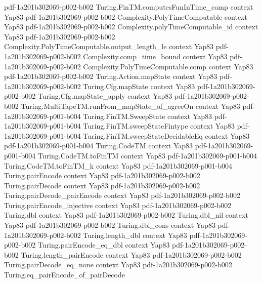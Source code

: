 \begin{theorem}
  {pdf-1a201b302069-p002-b002}
\proofstep
  {Turing.FinTM.computesFunInTime_comp}
  {context}
  {Yap83}
  {pdf-1a201b302069-p002-b002}
\proofstep
  {Complexity.PolyTimeComputable}
  {context}
  {Yap83}
  {pdf-1a201b302069-p002-b002}
\proofstep
  {Complexity.polyTimeComputable_id}
  {context}
  {Yap83}
  {pdf-1a201b302069-p002-b002}
\proofstep
  {Complexity.PolyTimeComputable.output_length_le}
  {context}
  {Yap83}
  {pdf-1a201b302069-p002-b002}
\proofstep
  {Complexity.comp_time_bound}
  {context}
  {Yap83}
  {pdf-1a201b302069-p002-b002}
\proofstep
  {Complexity.PolyTimeComputable.comp}
  {context}
  {Yap83}
  {pdf-1a201b302069-p002-b002}
\proofstep
  {Turing.Action.mapState}
  {context}
  {Yap83}
  {pdf-1a201b302069-p002-b002}
\proofstep
  {Turing.Cfg.mapState}
  {context}
  {Yap83}
  {pdf-1a201b302069-p002-b002}
\proofstep
  {Turing.Cfg.mapState_apply}
  {context}
  {Yap83}
  {pdf-1a201b302069-p002-b002}
\proofstep
  {Turing.MultiTapeTM.runFrom_mapState_of_agreeOn}
  {context}
  {Yap83}
  {pdf-1a201b302069-p001-b004}
\proofstep
  {Turing.FinTM.SweepState}
  {context}
  {Yap83}
  {pdf-1a201b302069-p001-b004}
\proofstep
  {Turing.FinTM.sweepStateFintype}
  {context}
  {Yap83}
  {pdf-1a201b302069-p001-b004}
\proofstep
  {Turing.FinTM.sweepStateDecidableEq}
  {context}
  {Yap83}
  {pdf-1a201b302069-p001-b004}
\proofstep
  {Turing.CodeTM}
  {context}
  {Yap83}
  {pdf-1a201b302069-p001-b004}
\proofstep
  {Turing.CodeTM.toFinTM}
  {context}
  {Yap83}
  {pdf-1a201b302069-p001-b004}
\proofstep
  {Turing.CodeTM.toFinTM_k}
  {context}
  {Yap83}
  {pdf-1a201b302069-p001-b004}
\proofstep
  {Turing.pairEncode}
  {context}
  {Yap83}
  {pdf-1a201b302069-p002-b002}
\proofstep
  {Turing.pairDecode}
  {context}
  {Yap83}
  {pdf-1a201b302069-p002-b002}
\proofstep
  {Turing.pairDecode_pairEncode}
  {context}
  {Yap83}
  {pdf-1a201b302069-p002-b002}
\proofstep
  {Turing.pairEncode_injective}
  {context}
  {Yap83}
  {pdf-1a201b302069-p002-b002}
\proofstep
  {Turing.dbl}
  {context}
  {Yap83}
  {pdf-1a201b302069-p002-b002}
\proofstep
  {Turing.dbl_nil}
  {context}
  {Yap83}
  {pdf-1a201b302069-p002-b002}
\proofstep
  {Turing.dbl_cons}
  {context}
  {Yap83}
  {pdf-1a201b302069-p002-b002}
\proofstep
  {Turing.length_dbl}
  {context}
  {Yap83}
  {pdf-1a201b302069-p002-b002}
\proofstep
  {Turing.pairEncode_eq_dbl}
  {context}
  {Yap83}
  {pdf-1a201b302069-p002-b002}
\proofstep
  {Turing.length_pairEncode}
  {context}
  {Yap83}
  {pdf-1a201b302069-p002-b002}
\proofstep
  {Turing.pairDecode_eq_none}
  {context}
  {Yap83}
  {pdf-1a201b302069-p002-b002}
\proofstep
  {Turing.eq_pairEncode_of_pairDecode}

\end{theorem}
